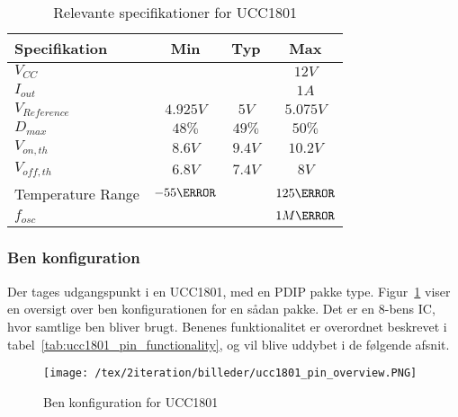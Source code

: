 \begin{table}[H] 			
	\centering
	\begin{tabularx}{\textwidth}{|X|c|c|c|} 
		\hline
		\textbf{Specifikation} & \textbf{Min} & \textbf{Typ} & \textbf{Max} \\ \hline
		$V_{CC}$ &  &  & $12V$ \\ \hline
		$I_{out}$ &  &  & $1A$ \\ \hline
		$V_{Reference}$ & $4.925V$ & $5V$ & $5.075V$ \\ \hline
		$D_{max}$ & $48\percent$ & $49\percent$ & $50\percent$ \\ \hline
		$V_{on,th}$ & $8.6V$ & $9.4V$ & $10.2V$ \\ \hline
		$V_{off,th}$ & $6.8V$ & $7.4V$ & $8V$ \\ \hline
		Temperature Range & $-55\degreeCelsius$ &  & $125\degreeCelsius$ \\ \hline
		$f_{osc}$ & & & $1M\hertz$ \\ \hline
	\end{tabularx}

	\caption{Relevante specifikationer for UCC1801}
	\label{tab:ucc1801_specs}
\end{table}


\subsubsection{Ben konfiguration}
Der tages udgangspunkt i en UCC1801, med en PDIP pakke type. Figur~\ref{fig:ucc1801_pin_overview} viser en oversigt over ben konfigurationen for en sådan pakke. Det er en 8-bens IC, hvor samtlige ben bliver brugt. Benenes funktionalitet er overordnet beskrevet i tabel~\ref{tab:ucc1801_pin_functionality}, og vil blive uddybet i de følgende afsnit.

\begin{figure}[H]
	\center
	\texttt{[image: /tex/2iteration/billeder/ucc1801\_pin\_overview.PNG]}
	\caption{Ben konfiguration for UCC1801}
	\label{fig:ucc1801_pin_overview}
\end{figure}

